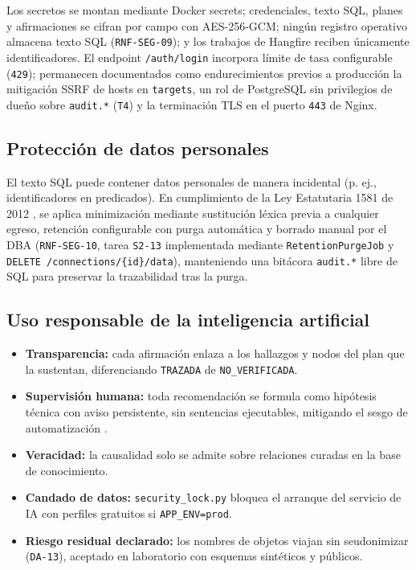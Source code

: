 \documentclass[12pt,a4paper]{article}
\begin{document}
Los secretos se montan mediante Docker secrets; credenciales, texto SQL, planes y afirmaciones se cifran por campo con AES-256-GCM; ningún registro operativo almacena texto SQL (\texttt{RNF-SEG-09}); y los trabajos de Hangfire reciben únicamente identificadores. El endpoint \texttt{/auth/login} incorpora límite de tasa configurable (\texttt{429}); permanecen documentados como endurecimientos previos a producción la mitigación SSRF de hosts en \texttt{targets}, un rol de PostgreSQL sin privilegios de dueño sobre \texttt{audit.*} (\texttt{T4}) y la terminación TLS en el puerto \texttt{443} de Nginx.

\subsection{Protección de datos personales}

El texto SQL puede contener datos personales de manera incidental (p. ej., identificadores en predicados). En cumplimiento de la Ley Estatutaria 1581 de 2012 \cite{ley-1581}, se aplica minimización mediante sustitución léxica previa a cualquier egreso, retención configurable con purga automática y borrado manual por el DBA (\texttt{RNF-SEG-10}, tarea \texttt{S2-13} implementada mediante \texttt{RetentionPurgeJob} y \texttt{DELETE /connections/\{id\}/data}), manteniendo una bitácora \texttt{audit.*} libre de SQL para preservar la trazabilidad tras la purga.

\subsection{Uso responsable de la inteligencia artificial}

\begin{itemize}[leftmargin=1.5em]
    \item \textbf{Transparencia:} cada afirmación enlaza a los hallazgos y nodos del plan que la sustentan, diferenciando \texttt{TRAZADA} de \texttt{NO\_VERIFICADA}.
    \item \textbf{Supervisión humana:} toda recomendación se formula como hipótesis técnica con aviso persistente, sin sentencias ejecutables, mitigando el sesgo de automatización \cite{parasuraman-bias}.
    \item \textbf{Veracidad:} la causalidad solo se admite sobre relaciones curadas en la base de conocimiento.
    \item \textbf{Candado de datos:} \texttt{security\_lock.py} bloquea el arranque del servicio de IA con perfiles gratuitos si \texttt{APP\_ENV=prod}.
    \item \textbf{Riesgo residual declarado:} los nombres de objetos viajan sin seudonimizar (\texttt{DA-13}), aceptado en laboratorio con esquemas sintéticos y públicos.
\end{itemize}
\end{document}
